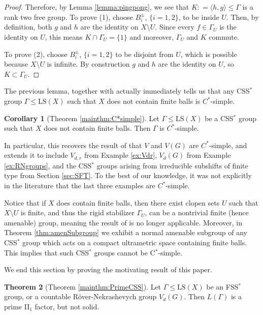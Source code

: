 \documentclass[12pt]{amsart}
\numberwithin{equation}{subsection}
\theoremstyle{definition}
\newtheorem{theorem}{Theorem}[section]
\newtheorem{corollary}[theorem]{Corollary}
\theoremstyle{definition}
\theoremstyle{remark}
\begin{document}
\begin{proof}
Therefore, by Lemma \ref{lemma:pingpong}, we see that $K : =\langle h, g \rangle \leq \Gamma$ is a rank two free group. To prove (1), choose $B_i^\pm$, $\{i=1,2\}$, to be inside $U$. Then, by definition, both $g$ and $h$ are the identity on $X \setminus U$. Since every $f \in \Gamma_U$ is the identity on $U$, this means $K  \cap \Gamma_U = \{1\}$ and moreover, $\Gamma_U$ and $K$ commute.

To prove (2), choose $B_i^\pm$, $\{i=1,2\}$ to be disjoint from $U$, which is possible because $X \setminus U$ is infinite. By construction $g$ and $h$ are the identity on $U$, so $K \subset \Gamma_U$. 
    
\end{proof}

The previous lemma, together with \cite[Corollary 1.3]{LeBoudecBon2018} actually immediately tells us that any CSS$^*$ group $\Gamma \leq \text{LS}(X)$ such that $X$ does not contain finite balls is $C^*$-simple. 

\begin{corollary}[Theorem \ref{mainthm:C*simple}]\label{cor:C*simple}
    Let $\Gamma \leq \text{LS}(X)$ be a CSS$^*$ group such that $X$ does not contain finite balls. Then $\Gamma$ is $C^*$-simple. 
\end{corollary}

In particular, this recovers the result of \cite{LeBoudecBon2018} that $V$ and $V(G)$ are $C^*$-simple, and extends it to include $V_{d,r}$ from Example \ref{ex:Vdr}, $V_d(G)$ from Example \ref{ex:RNgroups}, and the CSS$^*$ groups arising from irreducible subshifts of finite type from Section \ref{sec:SFT}. To the best of our knowledge, it was not explicitly in the literature that the last three examples are $C^*$-simple. 

Notice that if $X$ does contain finite balls, then there exist clopen sets $U$ such that $X \setminus U$ is finite, and thus the rigid stabilizer $\Gamma_U$, can be a nontrivial finite (hence amenable) group, meaning the result of \cite{LeBoudecBon2018} is no longer applicable. Moreover, in Theorem \ref{thm:amenSubgroup} we exhibit a normal amenable subgroup of any CSS$^*$ group which acts on a compact ultrametric space containing finite balls. This implies that such CSS$^*$ groups cannot be C$^*$-simple.


We end this section by proving the motivating result of this paper. 

\begin{theorem}[Theorem \ref{mainthm:PrimeCSS}]\label{thm:primeCSS}
    Let $\Gamma \leq \text{LS}(X)$ be an FSS$^*$ group, or a countable R\"over-Nekrashevych group $V_d(G)$. Then $L(\Gamma)$ is a prime II$_1$ factor, but not solid.
\end{theorem}
\end{document}
